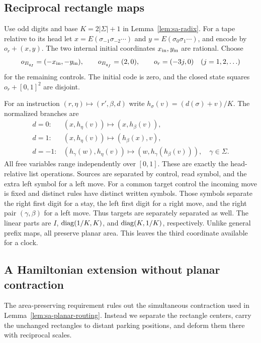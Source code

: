 \subsection{Reciprocal rectangle maps}
\label{subsec:sa-autonomous-rectangles}
Use odd digits and base $K=2|\Sigma|+1$ in Lemma~\ref{lem:sa-radix}.
For a tape relative to its head let
$x=E(\sigma_{-1}\sigma_{-2}\cdots)$ and
$y=E(\sigma_0\sigma_1\cdots)$, and encode by $o_r+(x,y)$.
The two internal initial coordinates $x_{\rm in},y_{\rm in}$ are
rational.  Choose
\begin{equation}\label{eq:sa-autonomous-offsets}
 o_{B_{q_I}}=(-x_{\rm in},-y_{\rm in}),\qquad
 o_{B_{q_f}}=(2,0),\qquad o_r=(-3j,0)\quad(j=1,2,\ldots)
\end{equation}
for the remaining controls.  The initial code is zero, and the closed
state squares $o_r+[0,1]^2$ are disjoint.

For an instruction $(r,\eta)\mapsto(r',\beta,d)$ write
$h_\sigma(v)=(d(\sigma)+v)/K$.  The normalized branches are
\begin{equation}\label{eq:sa-autonomous-branches}
\begin{array}{ll}
 d=0:&(x,h_\eta(v))\mapsto(x,h_\beta(v)),\\
 d=1:&(x,h_\eta(v))\mapsto(h_\beta(x),v),\\
 d=-1:&(h_\gamma(w),h_\eta(v))\mapsto
          (w,h_\gamma(h_\beta(v))),\quad\gamma\in\Sigma.
\end{array}
\end{equation}
All free variables range independently over $[0,1]$.
These are exactly the head-relative list operations.  Sources are
separated by control, read symbol, and the extra left symbol for a left
move.  For a common target control the incoming move is fixed and distinct
rules have distinct written symbols.  Those symbols separate the right
first digit for a stay, the left first digit for a right move, and the
right pair $(\gamma,\beta)$ for a left move.  Thus targets are separately
separated as well.  The linear parts are $I$, $\operatorname{diag}(1/K,K)$, and
$\operatorname{diag}(K,1/K)$, respectively.  Unlike general prefix maps, all preserve
planar area.  This leaves the third coordinate available for a clock.

\subsection{A Hamiltonian extension without planar contraction}
\label{subsec:sa-autonomous-extension}
The area-preserving requirement rules out the simultaneous contraction
used in Lemma~\ref{lem:sa-planar-routing}.  Instead we separate the
rectangle centers, carry the unchanged rectangles to distant parking
positions, and deform them there with reciprocal scales.

